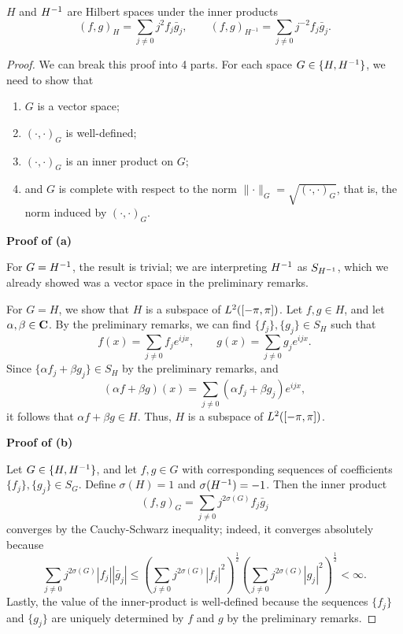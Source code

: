 \documentclass{homework}
\begin{document}
	\begin{arabicparts}
		\questionpart
		$H$ and ${H^{-1}}$ are Hilbert spaces under the inner products
		\begin{equation}
			(f,g)_H = \sum_{j\ne 0} j^2f_j\bar{g}_j, \qquad (f,g)_{H^{-1}} = \sum_{j\ne 0}j^{-2}f_j\bar{g}_j.
		\end{equation}
		
		\begin{proof}
			We can break this proof into 4 parts. For each space $G \in \{H, {H^{-1}}\}$, we need to show that
			
			\begin{enumerate}
				\item $G$ is a vector space;
				\item $(\cdot,\cdot)_G$ is well-defined;
				\item $(\cdot,\cdot)_G$ is an inner product on $G$;
				\item and $G$ is complete with respect to the norm $\lVert \cdot \rVert_G = \sqrt{(\cdot,\cdot)_G}$, that is, the norm induced by $(\cdot,\cdot)_G$.
			\end{enumerate}
			
			\textbf{Proof of (a)}
			
			For $G = {H^{-1}}$, the result is trivial; we are interpreting ${H^{-1}}$ as $S_{H^{-1}}$, which we already showed was a vector space in the preliminary remarks.
			
			For $G = H$, we show that $H$ is a subspace of $L^2([-\pi, \pi])$. Let $f, g\in H$, and let $\alpha, \beta \in \textbf{C}$. By the preliminary remarks, we can find $\{f_j\}, \{g_j\} \in S_H$ such that
			\begin{equation}
				f(x) = \sum_{j\ne 0}f_je^{ijx}, \qquad g(x) = \sum_{j\ne 0 }g_je^{ijx}.
			\end{equation}
			Since $\{\alpha f_j + \beta g_j\} \in S_H$ by the preliminary remarks, and
			\begin{equation}
				(\alpha f + \beta g)(x) = \sum_{j\ne 0}(\alpha f_j + \beta g_j)e^{ijx},
			\end{equation}
			it follows that $\alpha f + \beta g \in H$. Thus, $H$ is a subspace of $L^2([-\pi, \pi])$.
			
			\textbf{Proof of (b)}
			
			Let $G\in \{H,{H^{-1}}\}$, and let $f, g\in G$ with corresponding sequences of coefficients $\{f_j\},\{g_j\}\in S_G$. Define $\sigma(H) =1$ and $\sigma({H^{-1}})  =-1$. Then the inner product
			\begin{equation}
				(f,g)_G = \sum_{j\ne 0} j^{2\sigma(G)}f_j\bar{g}_j
			\end{equation}
			converges by the Cauchy-Schwarz inequality; indeed, it converges absolutely because
			\begin{equation}
				\sum_{j\ne 0} j^{2\sigma(G)}|f_j||\bar{g}_j| \le \left(\sum_{j\ne0}j^{2\sigma(G)}|f_j|^2\right)^\frac{1}{2}\left(\sum_{j\ne 0}j^{2\sigma(G)}|g_j|^2\right)^\frac{1}{2} < \infty.
			\end{equation}
			Lastly, the value of the inner-product is well-defined because the sequences $\{f_j\}$ and $\{g_j\}$ are uniquely determined by $f$ and $g$ by the preliminary remarks.
			

\end{proof}
\end{arabicparts}
\end{document}
